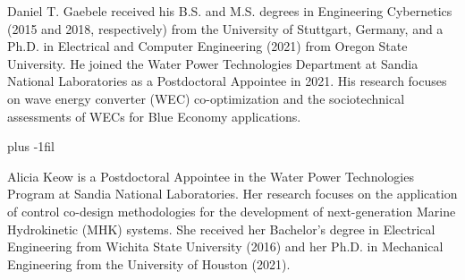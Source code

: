 \documentclass[lettersize,journal]{IEEEtran}
\begin{document}
\begin{IEEEbiography}{Daniel T. Gaebele}
received his B.S. and M.S. degrees in Engineering Cybernetics (2015 and 2018, respectively) from the University of Stuttgart, Germany, and a Ph.D. in Electrical and Computer Engineering (2021) from Oregon State University. 
He joined the Water Power Technologies Department at Sandia National Laboratories as a Postdoctoral Appointee in 2021. 
His research focuses on wave energy converter (WEC) co-optimization and the sociotechnical assessments of WECs for Blue Economy applications.
\end{IEEEbiography}

\vskip 0pt plus -1fil

\begin{IEEEbiography}{Alicia Keow}
is a Postdoctoral Appointee in the Water Power Technologies Program at Sandia National Laboratories. 
Her research focuses on the application of control co-design methodologies for the development of next-generation Marine Hydrokinetic (MHK) systems. 
She received her Bachelor's degree in Electrical Engineering from Wichita State University (2016) and her Ph.D. in Mechanical Engineering from the University of Houston (2021).
\end{IEEEbiography}
\end{document}
